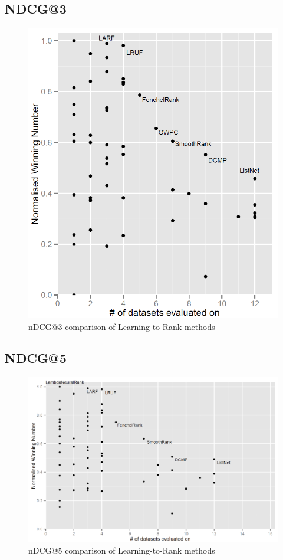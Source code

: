\subsection{NDCG@3}
\begin{figure}[!h]
\includegraphics[scale=0.35]{gfx/ndcg3_winnum}
\caption{\acs{nDCG}@3 comparison of Learning-to-Rank methods}
\label{fig:normalised_winning_number_ndcg3}
\end{figure}

\subsection{NDCG@5}
\begin{figure}[!h]
\includegraphics[scale=0.35]{gfx/ndcg5_winnum}
\caption{\acs{nDCG}@5 comparison of Learning-to-Rank methods}
\label{fig:normalised_winning_number_ndcg5}
\end{figure}

